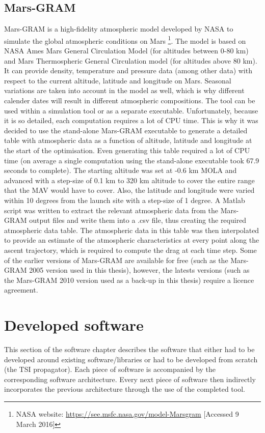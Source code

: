 \subsection{Mars-\ac{GRAM}}
\label{subsec:marsgram}
Mars-\ac{GRAM} is a high-fidelity atmospheric model developed by NASA to simulate the global atmospheric conditions on Mars \citep{justus2008utilizing} \footnote{NASA website: \url{https://see.msfc.nasa.gov/model-Marsgram} [Accessed 9 March 2016]}. The model is based on NASA Ames Mars General Circulation Model (for altitudes between 0-80 km) and Mars Thermospheric General Circulation model (for altitudes above 80 km). It can provide density, temperature and pressure data (among other data) with respect to the current altitude, latitude and longitude on Mars.  Seasonal variations are taken into account in the model as well, which is why different calender dates will result in different atmospheric compositions. The tool can be used within a simulation tool or as a separate executable. Unfortunately, because it is so detailed, each computation requires a lot of CPU time. This is why it was decided to use the stand-alone Mars-\ac{GRAM} executable to generate a detailed table with atmospheric data as a function of altitude, latitude and longitude at the start of the optimisation. Even generating this table required a lot of CPU time (on average a single computation using the stand-alone executable took 67.9 seconds to complete). The starting altitude was set at -0.6 km \ac{MOLA} and advanced with a step-size of 0.1 km to 320 km altitude to cover the entire range that the \ac{MAV} would have to cover. Also, the latitude and longitude were varied within 10 degrees from the launch site with a step-size of 1 degree. A Matlab script was written to extract the relevant atmospheric data from the Mars-\ac{GRAM} output files and write them into a .csv file, thus creating the required atmospheric data table. The atmospheric data in this table was then interpolated to provide an estimate of the atmospheric characteristics at every point along the ascent trajectory, which is required to compute the drag at each time step. Some of the earlier versions of Mars-\ac{GRAM} are available for free (such as the Mars-\ac{GRAM} 2005 version used in this thesis), however, the latests versions (such as the Mars-\ac{GRAM} 2010 version used as a back-up in this thesis) require a licence agreement.


\section{Developed software}
\label{sec:developedsoftware}
This section of the software chapter describes the software that either had to be developed around existing software/libraries or had to be developed from scratch (the \ac{TSI} propagator). Each piece of software is accompanied by the corresponding software architecture. Every next piece of software then indirectly incorporates the previous architecture through the use of the completed tool.


